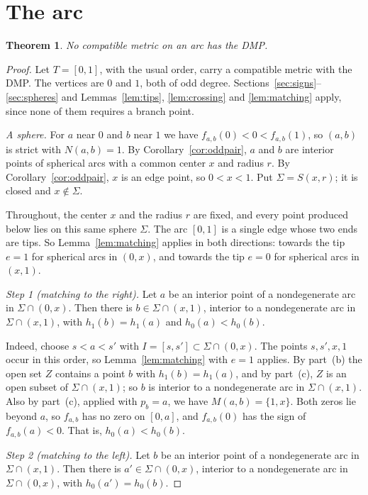 \documentclass[11pt]{amsart}
\newtheorem{theorem}{Theorem}[section]
\theoremstyle{definition}
\theoremstyle{remark}
\newcommand{\M}{M}
\newcommand{\N}{N}
\begin{document}
\section{The arc}\label{sec:arc}

\begin{theorem}\label{thm:arc}
No compatible metric on an arc has the DMP.
\end{theorem}

\begin{proof}
Let $T=[0,1]$, with the usual order, carry a compatible metric with the DMP. The vertices are $0$ and $1$, both of odd degree. Sections~\ref{sec:signs}--\ref{sec:spheres} and Lemmas~\ref{lem:tips}, \ref{lem:crossing} and \ref{lem:matching} apply, since none of them requires a branch point.

\emph{A sphere.} For $a$ near $0$ and $b$ near $1$ we have $f_{a,b}(0)<0<f_{a,b}(1)$, so $(a,b)$ is strict with $\N(a,b)=1$. By Corollary~\ref{cor:oddpair}, $a$ and $b$ are interior points of spherical arcs with a common center $x$ and radius $r$. By Corollary~\ref{cor:oddpair}, $x$ is an edge point, so $0<x<1$. Put $\Sigma=S(x,r)$; it is closed and $x\notin\Sigma$.

Throughout, the center $x$ and the radius $r$ are fixed, and every point produced below lies on this same sphere $\Sigma$. The arc $[0,1]$ is a single edge whose two ends are tips. So Lemma~\ref{lem:matching} applies in both directions: towards the tip $e=1$ for spherical arcs in $(0,x)$, and towards the tip $e=0$ for spherical arcs in $(x,1)$.

\emph{Step 1 (matching to the right).} Let $a$ be an interior point of a nondegenerate arc in $\Sigma\cap(0,x)$. Then there is $b\in\Sigma\cap(x,1)$, interior to a nondegenerate arc in $\Sigma\cap(x,1)$, with $h_1(b)=h_1(a)$ and $h_0(a)<h_0(b)$.

Indeed, choose $s<a<s'$ with $I=[s,s']\subset\Sigma\cap(0,x)$. The points $s,s',x,1$ occur in this order, so Lemma~\ref{lem:matching} with $e=1$ applies. By part~(b) the open set $Z$ contains a point $b$ with $h_1(b)=h_1(a)$, and by part~(c), $Z$ is an open subset of $\Sigma\cap(x,1)$; so $b$ is interior to a nondegenerate arc in $\Sigma\cap(x,1)$. Also by part~(c), applied with $p_b=a$, we have $\M(a,b)=\{1,x\}$. Both zeros lie beyond $a$, so $f_{a,b}$ has no zero on $[0,a]$, and $f_{a,b}(0)$ has the sign of $f_{a,b}(a)<0$. That is, $h_0(a)<h_0(b)$.

\emph{Step 2 (matching to the left).} Let $b$ be an interior point of a nondegenerate arc in $\Sigma\cap(x,1)$. Then there is $a'\in\Sigma\cap(0,x)$, interior to a nondegenerate arc in $\Sigma\cap(0,x)$, with $h_0(a')=h_0(b)$.


\end{proof}
\end{document}
